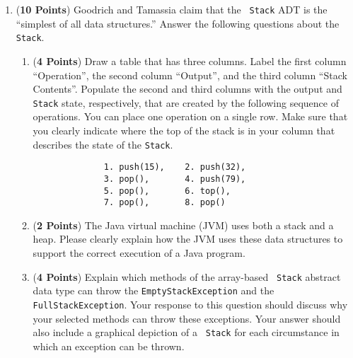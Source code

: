 \documentclass[12pt]{article}
\begin{document}
\begin{enumerate}
        \newpage

      \item ({\bf 10 Points}) Goodrich and Tamassia claim that the {\tt
          Stack} ADT is the ``simplest of all data structures.''  Answer the
        following questions about the {\tt Stack}.

        \begin{enumerate}

          \item ({\bf 4 Points}) Draw a table that has three columns.  Label the
            first column ``Operation'', the second column ``Output'', and the
            third column ``Stack Contents''.  Populate the second and third
            columns with the output and {\tt Stack} state, respectively, that
            are created by the following sequence of operations.  You can place
            one operation on a single row.  Make sure that you clearly indicate
            where the top of the stack is in your column that describes the
            state of the {\tt Stack}.

            \begin{verbatim} 
              1. push(15),    2. push(32), 
              3. pop(),       4. push(79),
              5. pop(),       6. top(), 
              7. pop(),       8. pop() 
            \end{verbatim}

            \vspace*{-.3in}

          \item ({\bf 2 Points}) The Java virtual machine (JVM) uses both a
            stack and a heap.  Please clearly explain how the JVM uses these
            data structures to support the correct execution of a Java program.


          \item ({\bf 4 Points}) Explain which methods of the array-based {\tt
              Stack} abstract data type can throw the {\tt EmptyStackException}
            and the {\tt FullStackException}.  Your response to this question
            should discuss why your selected methods can throw these exceptions.
            Your answer should also include a graphical depiction of a {\tt
              Stack} for each circumstance in which an exception can be thrown.


\end{enumerate}
\end{enumerate}
\end{document}
